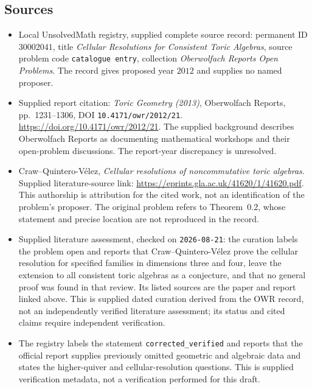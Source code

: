 \documentclass[11pt]{article}
\begin{document}
\subsection{Sources}
\begin{itemize}
\item Local UnsolvedMath registry, supplied complete source record: permanent ID \(30002041\), title \emph{Cellular Resolutions for Consistent Toric Algebras}, source problem code \texttt{catalogue entry}, collection \emph{Oberwolfach Reports Open Problems}. The record gives proposed year \(2012\) and supplies no named proposer.
\item Supplied report citation: \emph{Toric Geometry (2013)}, Oberwolfach Reports, pp.~1231--1306, DOI \texttt{10.4171/owr/2012/21}. \url{https://doi.org/10.4171/owr/2012/21}. The supplied background describes Oberwolfach Reports as documenting mathematical workshops and their open-problem discussions. The report-year discrepancy is unresolved.
\item Craw--Quintero-V\'elez, \emph{Cellular resolutions of noncommutative toric algebras}. Supplied literature-source link: \url{https://eprints.gla.ac.uk/41620/1/41620.pdf}. This authorship is attribution for the cited work, not an identification of the problem's proposer. The original problem refers to Theorem~0.2, whose statement and precise location are not reproduced in the record.
\item Supplied literature assessment, checked on \texttt{2026-08-21}: the curation labels the problem open and reports that Craw--Quintero-V\'elez prove the cellular resolution for specified families in dimensions three and four, leave the extension to all consistent toric algebras as a conjecture, and that no general proof was found in that review. Its listed sources are the paper and report linked above. This is supplied dated curation derived from the OWR record, not an independently verified literature assessment; its status and cited claims require independent verification.
\item The registry labels the statement \texttt{corrected\_verified} and reports that the official report supplies previously omitted geometric and algebraic data and states the higher-quiver and cellular-resolution questions. This is supplied verification metadata, not a verification performed for this draft.
\end{itemize}
\end{document}
